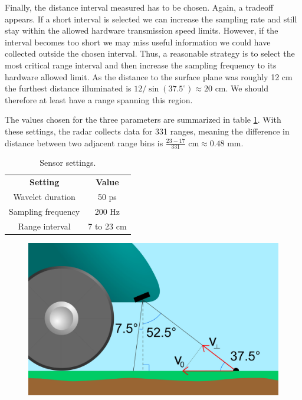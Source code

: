 Finally, the distance interval measured has to be chosen. Again, a tradeoff appears. If a short interval is selected we can increase the sampling rate and still stay within the allowed hardware transmission speed limits. However, if the interval becomes too short we may miss useful information we could have collected outside the chosen interval. Thus, a reasonable strategy is to select the most critical range interval and then increase the sampling frequency to its hardware allowed limit. As the distance to the surface plane was roughly 12 cm the furthest distance illuminated is $12/\sin(37.5^\circ)\approx 20$ cm. We should therefore at least have a range spanning this region. 

The values chosen for the three parameters are summarized in table \ref{tab:sensor_settings}. With these settings, the radar collects data for 331 ranges, meaning the difference in distance between two adjacent range bins is $\frac{23-17}{331}\textrm{ cm}\approx0.48 \textrm{ mm}$.

\begin{table}
\begin{center}
	\begin{tabular}{|c|c|}
	  	\hline
	  	\cellcolor{gray!150}\color{white}\textbf{Setting} & \cellcolor{gray!150}\color{white}\textbf{Value} \\
	 	 Wavelet duration & 50 ps \\
	  	\cellcolor{gray!25}Sampling frequency & \cellcolor{gray!25}200 Hz \\
	  	Range interval & 7 to 23 cm \\ 
		\hline
  	\end{tabular}	
\end{center}
\caption{Sensor settings.}
\label{tab:sensor_settings}
\end{table}



\begin{figure}[h]
	\centering
	\includegraphics[scale=0.30]{figs_temp/sensor_placement.jpg}
	\caption{}
	\label{fig:sensor_placement}
\end{figure}

